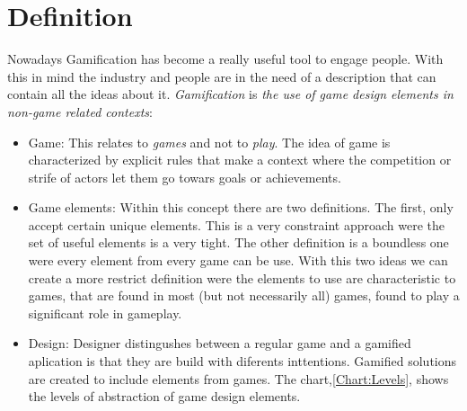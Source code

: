 \section{Definition}

Nowadays Gamification has become a really useful tool to engage people. With this in
mind the industry and people are in the need of a description that can contain
all the ideas about it. \emph{Gamification} is \emph{the use of game design elements
in non-game related contexts}:

\begin{itemize}

\item Game: This relates to \emph{games} and not to \emph{play}. The idea of game is
characterized by explicit rules that make a context where the competition or strife
of actors let them go towars goals or achievements.    

\item Game elements: Within this concept there are two definitions. The first,
only accept certain unique elements. This is a very constraint approach were the set
of useful elements is a very tight. The other definition is a boundless one were every
element from every game can be use. With this two ideas we can create a more restrict 
definition were the elements to use are characteristic to games, that are
found in most (but not necessarily all) games, found to play a significant role in gameplay. 

\item Design: Designer distingushes between a regular game and a gamified aplication 
is that they are build with diferents inttentions. Gamified solutions are created to 
include elements from games. The chart,\ref{Chart:Levels}, shows the levels of 
abstraction of game design elements.


\end{itemize}
